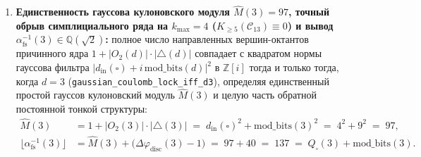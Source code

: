 \begin{theorem}
\begin{enumerate}[label=\textbf{(\arabic*)},leftmargin=*]
  \begin{equation}
    \label{eq:mono-su2-comm}
    [L_1, L_2] \;=\; L_3, \qquad
    [L_2, L_3] \;=\; L_1, \qquad
    [L_3, L_1] \;=\; L_2;
  \end{equation}
  (в)~на $K_4(3) = 8$ тетраэдрических 4-кликах три цветовые плоскости каждого радиального бариона $K_3$ порождают $3^2 - 1 = 8$ бесследовых матричных генераторов $\mathfrak{su}(3)$ ($6$ корневых переходов $E_{ab}$ при $a \ne b \in \{1,2,3\}$ и $2$ диагональных генератора Картана $H_1 = \operatorname{diag}(1,-1,0)$, $H_2 = \operatorname{diag}(0,1,-1)$), удовлетворяющих соотношениям Шевалле--Серра:
  \begin{align}
    [E_{12}, E_{23}] &= E_{13}, \qquad
    [E_{12}, E_{21}] \;=\; H_1, \qquad
    [E_{23}, E_{32}] \;=\; H_2, \label{eq:mono-su3-comm} \\
    [H_1, H_2] &= 0, \qquad
    \operatorname{Tr}(H_1) \;=\; \operatorname{Tr}(H_2) \;=\; 0. \label{eq:mono-su3-cartan}
  \end{align}
\item \textbf{Единственность гауссова кулоновского модуля $\widehat{M}(3) = 97$, точный обрыв симплициального ряда на $k_{\max} = 4$ ($K_{\ge 5}(\mathcal{C}_{13}) \equiv 0$) и вывод $\alpha_{\mathrm{fs}}^{-1}(3) \in \mathbb{Q}(\sqrt{2})$:}
  полное число направленных вершин-октантов причинного ядра $1 + |O_2(d)|\cdot|{\triangle}(d)|$ совпадает с квадратом нормы гауссова фильтра $|d_{\mathrm{in}}(\square) + i\,\mathrm{mod\_bits}(d)|^2$ в $\mathbb{Z}[i]$ тогда и только тогда, когда $d = 3$ (\texttt{gaussian\_\allowbreak coulomb\_\allowbreak lock\_\allowbreak iff\_\allowbreak d3}), определяя единственный простой гауссов кулоновский модуль $\widehat{M}(3)$ и целую часть обратной постоянной тонкой структуры:
  \begin{align}
    \widehat{M}(3) &= 1 + |O_2(3)|\cdot|{\triangle}(3)| \;=\; d_{\mathrm{in}}(\square)^2 + \mathrm{mod\_bits}(3)^2 \;=\; 4^2 + 9^2 \;=\; 97, \label{eq:mono-mhat-97} \\
    \bigl\lfloor \alpha_{\mathrm{fs}}^{-1}(3) \bigr\rfloor &= \widehat{M}(3) + \bigl(\Delta\varphi_{\mathrm{disc}}(3) - 1\bigr) \;=\; 97 + 40 \;=\; 137 \;=\; Q_\square(3) + \mathrm{mod\_bits}(3). \label{eq:mono-alpha-fs}
  \end{align}

\end{enumerate}
\end{theorem}
